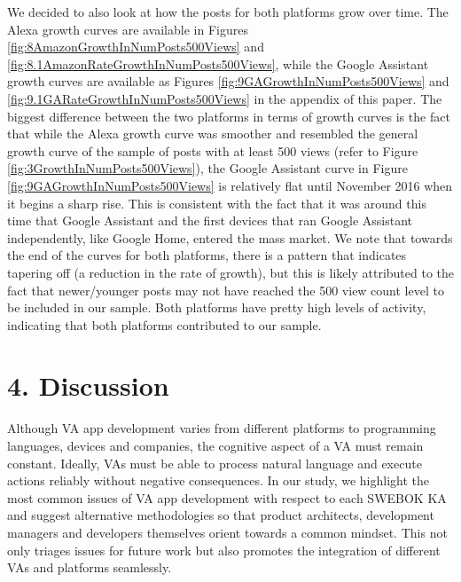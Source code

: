 \documentclass{sigchi}
\begin{document}
We decided to also look at how the posts for both platforms grow over time. The Alexa growth curves are available in Figures \ref{fig:8AmazonGrowthInNumPosts500Views} and \ref{fig:8.1AmazonRateGrowthInNumPosts500Views}, while the Google Assistant growth curves are available as Figures \ref{fig:9GAGrowthInNumPosts500Views} and \ref{fig:9.1GARateGrowthInNumPosts500Views} in the appendix of this paper. The biggest difference between the two platforms in terms of growth curves is the fact that while the Alexa growth curve was smoother and resembled the general growth curve of the sample of posts with at least 500 views (refer to Figure \ref{fig:3GrowthInNumPosts500Views}), the Google Assistant curve in Figure \ref{fig:9GAGrowthInNumPosts500Views} is relatively flat until November 2016 when it begins a sharp rise. This is consistent with the fact that it was around this time that Google Assistant and the first devices that ran Google Assistant independently, like Google Home, entered the mass market. We note that towards the end of the curves for both platforms, there is a pattern that indicates tapering off (a reduction in the rate of growth), but this is likely attributed to the fact that newer/younger posts may not have reached the 500 view count level to be included in our sample. Both platforms have pretty high levels of activity, indicating that both platforms contributed to our sample.

\section{4. Discussion}
Although VA app development varies from different platforms to programming languages, devices and companies, the cognitive aspect of a VA must remain constant. Ideally, VAs must be able to process natural language and execute actions reliably without negative consequences. In our study, we highlight the most common issues of VA app development with respect to each SWEBOK KA and suggest alternative methodologies so that product architects, development managers and developers themselves orient towards a common mindset. This not only triages issues for future work but also promotes the integration of different VAs and platforms seamlessly.
\end{document}
